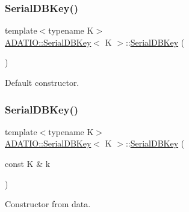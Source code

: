\mbox{\label{classADATIO_1_1SerialDBKey_acaf28250dcc8a2b3944f7edef046df05}} 
\subsubsection{\texorpdfstring{SerialDBKey()}{SerialDBKey()}\hspace{0.1cm}{\footnotesize\ttfamily [5/6]}}
{\footnotesize\ttfamily template$<$typename K$>$ \\
\mbox{\hyperlink{classADATIO_1_1SerialDBKey}{A\+D\+A\+T\+I\+O\+::\+Serial\+D\+B\+Key}}$<$ K $>$\+::\mbox{\hyperlink{classADATIO_1_1SerialDBKey}{Serial\+D\+B\+Key}} (\begin{DoxyParamCaption}{ }\end{DoxyParamCaption})\hspace{0.3cm}{\ttfamily [inline]}}



Default constructor. 

\mbox{\label{classADATIO_1_1SerialDBKey_ad035f1ac5d8565aec4e5a7197333123f}} 
\subsubsection{\texorpdfstring{SerialDBKey()}{SerialDBKey()}\hspace{0.1cm}{\footnotesize\ttfamily [6/6]}}
{\footnotesize\ttfamily template$<$typename K$>$ \\
\mbox{\hyperlink{classADATIO_1_1SerialDBKey}{A\+D\+A\+T\+I\+O\+::\+Serial\+D\+B\+Key}}$<$ K $>$\+::\mbox{\hyperlink{classADATIO_1_1SerialDBKey}{Serial\+D\+B\+Key}} (\begin{DoxyParamCaption}\item[{const K \&}]{k }\end{DoxyParamCaption})\hspace{0.3cm}{\ttfamily [inline]}}



Constructor from data. 



